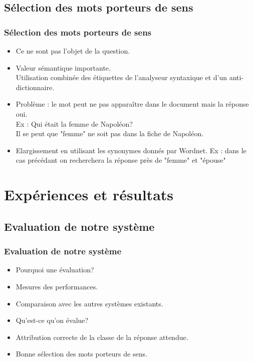 \documentclass[xcolor=dvipsnames]{beamer}
\begin{document}
\subsection{Sélection des mots porteurs de sens}
\frame
{
    \frametitle{Sélection des mots porteurs de sens}
    \begin{itemize}
        \item<1-> Ce ne sont pas l'objet de la question.
        \item<2-> Valeur sémantique importante. \\
            Utilisation combinée des étiquettes de l'analyseur syntaxique et d'un anti-dictionnaire.
        \item<3-> Problème : le mot peut ne pas apparaître dans le document mais la réponse oui.\\
               Ex : Qui était la femme de Napoléon?\\
               Il se peut que "femme" ne soit pas dans la fiche de Napoléon.
        \item<4-> Elargissement en utilisant les synonymes donnés par Wordnet.
            Ex : dans le cas précédant on recherchera la réponse près de "femme" et "épouse"
    \end{itemize}
}

\section{Expériences et résultats}
\subsection{Evaluation de notre système}
\frame
{
  \frametitle{Evaluation de notre système}
  \begin{itemize}
    \item<1-> Pourquoi une évaluation?
    \item<2-> Mesures des performances.
    \item<3-> Comparaison avec les autres systèmes existants.
    \item<4-> Qu'est-ce qu'on évalue?
    \item<5-> Attribution correcte de la classe de la réponse attendue.
    \item<6-> Bonne sélection des mots porteurs de sens.
  \end{itemize}
}
\end{document}
